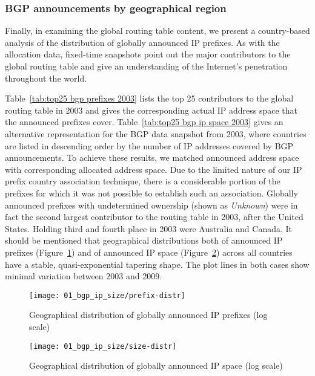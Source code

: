 \subsubsection{BGP announcements by geographical region}

Finally, in examining the global routing table content, we present a
country-based analysis of the distribution of globally announced IP prefixes.
As with the allocation data, fixed-time snapshots point out the major
contributors to the global routing table and give an understanding of the
Internet's penetration throughout the world.

Table~\ref{tab:top25 bgp prefixes 2003} lists the top 25 contributors to the
global routing table in 2003 and gives the corresponding actual IP address
space that the announced prefixes cover. Table~\ref{tab:top25 bgp ip space
2003} gives an alternative representation for the BGP data snapshot from 2003,
where countries are listed in descending order by the number of IP addresses
covered by BGP announcements. To achieve these results, we matched announced
address space with corresponding allocated address space.  Due to the limited
nature of our IP prefix country association technique, there is a considerable
portion of the prefixes for which it was not possible to establish such an
association. Globally announced prefixes with undetermined ownership (shown as
\emph{Unknown}) were in fact the second largest contributor to the routing
table in 2003, after the United States. Holding third and fourth place in 2003
were Australia and Canada. It should be mentioned that geographical
distributions both of announced IP prefixes (Figure~\ref{fig:prefix distr}) and
of announced IP space (Figure~\ref{fig:size distr}) across all countries have a
stable, quasi-exponential tapering shape.  The plot lines in both cases show
minimal variation between 2003 and 2009.

\begin{figure}[htbp]
	\centering
		\texttt{[image: 01\_bgp\_ip\_size/prefix-distr]}
	\caption{Geographical distribution of globally announced IP prefixes (log scale)}
	\label{fig:prefix distr}
\end{figure}

\begin{figure}[htbp]
	\centering
		\texttt{[image: 01\_bgp\_ip\_size/size-distr]}
	\caption{Geographical distribution of globally announced IP space (log scale)}
	\label{fig:size distr}
\end{figure}

